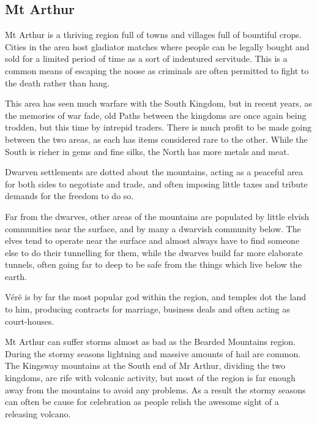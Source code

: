 \subsection{Mt Arthur}

Mt Arthur is a thriving region full of towns and villages full of bountiful crops.  Cities in the area host gladiator matches where people can be legally bought and sold for a limited period of time as a sort of indentured servitude.  This is a common means of escaping the noose as criminals are often permitted to fight to the death rather than hang.

	This area has seen much warfare with the South Kingdom, but in recent years, as the memories of war fade, old Paths between the kingdoms are once again being trodden, but this time by intrepid traders.  There is much profit to be made going between the two areas, as each has items considered rare to the other.  While the South is richer in gems and fine silks, the North has more metals and meat.

	Dwarven settlements are dotted about the mountains, acting as a peaceful area for both sides to negotiate and trade, and often imposing little taxes and tribute demands for the freedom to do so.

	Far from the dwarves, other areas of the mountains are populated by little elvish communities near the surface, and by many a dwarvish community below.  The elves tend to operate near the surface and almost always have to find someone else to do their tunnelling for them, while the dwarves build far more elaborate tunnels, often going far to deep to be safe from the things which live below the earth.

	V\'{e}r\"{e} is by far the most popular god within the region, and temples dot the land to him, producing contracts for marriage, business deals and often acting as court-houses.

	Mt Arthur can suffer storms almost as bad as the Bearded Mountains region.  During the stormy seasons lightning and massive amounts of hail are common.  The Kingsway mountains at the South end of Mr Arthur, dividing the two kingdoms, are rife with volcanic activity, but most of the region is far enough away from the mountains to avoid any problems.  As a result the stormy seasons can often be cause for celebration as people relish the awesome sight of a releasing volcano.




